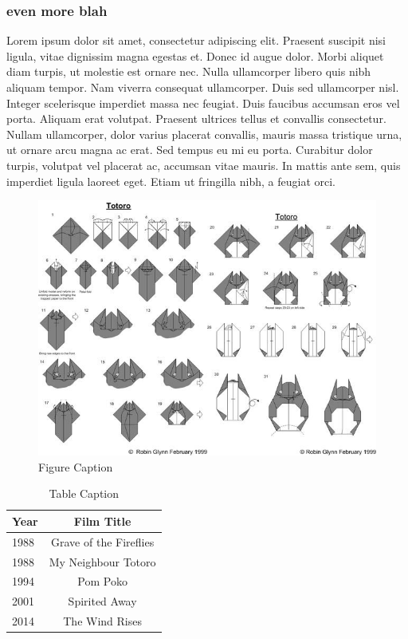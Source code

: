 \subsubsection{even more blah}				%
Lorem ipsum dolor sit amet, consectetur adipiscing elit. Praesent suscipit nisi ligula, vitae dignissim magna egestas et. Donec id augue dolor. Morbi aliquet diam turpis, ut molestie est ornare nec. Nulla ullamcorper libero quis nibh aliquam tempor. Nam viverra consequat ullamcorper. Duis sed ullamcorper nisl. Integer scelerisque imperdiet massa nec feugiat. Duis faucibus accumsan eros vel porta. Aliquam erat volutpat. Praesent ultrices tellus et convallis consectetur. Nullam ullamcorper, dolor varius placerat convallis, mauris massa tristique urna, ut ornare arcu magna ac erat. Sed tempus eu mi eu porta. Curabitur dolor turpis, volutpat vel placerat ac, accumsan vitae mauris. In mattis ante sem, quis imperdiet ligula laoreet eget. Etiam ut fringilla nibh, a feugiat orci.


\begin{figure}[t]
\centering
\includegraphics[scale=0.6]{./fig/totoro-origami.jpg}
\caption[Figure caption entry for list of figures]{Figure Caption}
\label{fig:example}		
\end{figure}


\begin{table}[t]
\centering
\caption[Table caption entry for list of tables]{Table Caption}
\label{tab:example1}
\begin{tabular}{lc}
\hline
\textbf{Year} & \textbf{Film Title} \\
\hline
1988 & Grave of the Fireflies \\
1988 & My Neighbour Totoro \\
1994 & Pom Poko \\
2001 & Spirited Away \\
2014 & The Wind Rises \\
\hline
\end{tabular}
\end{table}

